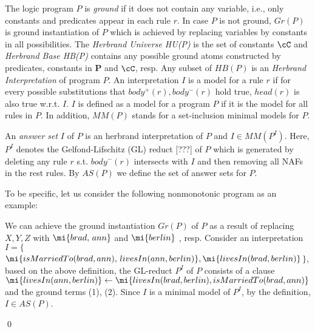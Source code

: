 The logic program $P$ is \textit{ground} if it does not contain any variable, i.e., only constants and predicates appear in each rule $r$. In case $P$ is not ground, $Gr(P)$ is ground instantiation of $P$ which is achieved by replacing variables by constants in all possibilities. The \textit{Herbrand Universe HU(P)} is the set of constants $\cC$ and \textit{Herbrand Base HB(P)} contains any possible ground atoms constructed by predicates, constants in \textbf{P} and $\cC$, resp. Any subset of $HB(P)$ is an \textit{Herbrand Interpretation} of program $P$. An interpretation $I$ is a model for a rule $r$ if for every possible substitutions that $body^+(r), body^-(r)$ hold true, $head(r)$ is also true w.r.t. $I$. $I$ is defined as a model for a program $P$ if it is the model for all rules in $P$. In addition, $MM(P)$ stands for a set-inclusion minimal models for $P$.

An \textit{answer set} $I$ of $P$ is an herbrand interpretation of $P$ and $I \in MM(P^I)$. Here, $P^I$ denotes the Gelfond-Lifschitz (GL) reduct [???] of $P$ which is generated by deleting any rule $r$ s.t. $body^-(r)$ intersects with $I$ and then removing all NAFs in the rest rules. By $AS(P)$ we define the set of answer sets for $P$.

\begin{example}\label{ex:as}
To be specific, let us consider the following nonmonotonic program as an example:\\
{\small {}}
            
\normalsize
{\smallskip

\noindent            
We can achieve the ground instantiation $Gr(P)$ of $P$ as a result of replacing $X,Y,Z$ with $\mi{brad, \,ann}$ and $\mi{berlin}$ , resp. Consider an interpretation $I=\{${\small$\mi{isMarriedTo(brad,ann),\,livesIn(ann,berlin)},\\ \mi{livesIn(brad,berlin)}$}$\}$, based on the above definition, the GL-reduct $P^I$ of $P$ consists of a clause $\mi{livesIn(ann,berlin)}\leftarrow \mi{livesIn(brad,berlin),isMarriedTo(brad,ann)}$ and the ground terms (1), (2). Since $I$ is a minimal model of $P^I$, by the definition, $I \in AS(P)$.}\qed
\end{example}


